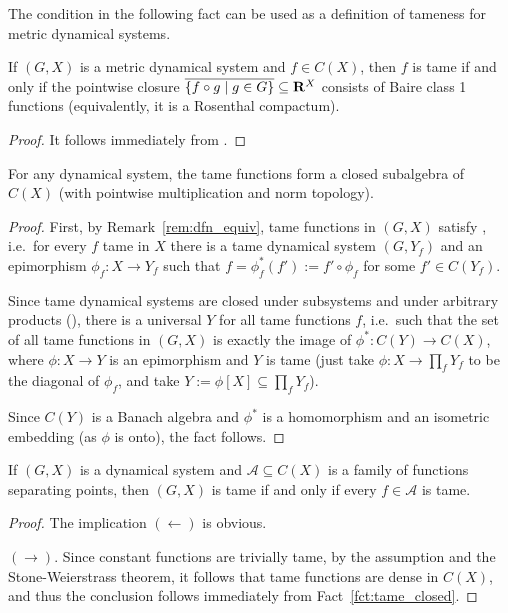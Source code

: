 	
	The condition in the following fact can be used as a definition of tameness for metric dynamical systems.
	\begin{fct}\label{fct: metric tameness}
		If $(G,X)$ is a metric dynamical system and $f\in C(X)$, then $f$ is tame if and only if the pointwise closure $\overline{\{f\circ g\mid g\in G \} }\subseteq {{\mathbf{R}}}^X$ consists of Baire class 1 functions (equivalently, it is a Rosenthal compactum).
	\end{fct}
	\begin{proof}
		It follows immediately from \cite[Fact 4.3 and Proposition 4.6]{GM12}.
	\end{proof}
	
	
	\begin{fct}
		\label{fct:tame_closed}
		For any dynamical system, the tame functions form a closed subalgebra of $C(X)$ (with pointwise multiplication and norm topology).
	\end{fct}
	\begin{proof}
		First, by Remark~\ref{rem:dfn_equiv}, tame functions in $(G,X)$ satisfy \cite[Definition 5.5]{GM12}, i.e.\ for every $f$ tame in $X$ there is a tame dynamical system $(G,Y_f)$ and an epimorphism $\phi_f\colon X\to Y_f$ such that $f=\phi_f^*(f'):=f'\circ \phi_f$ for some $f'\in C(Y_f)$.
		
		Since tame dynamical systems are closed under subsystems and under arbitrary products (\cite[Lemma 5.4]{GM12}), there is a universal $Y$ for all tame functions $f$, i.e.\ such that the set of all tame functions in $(G,X)$ is exactly the image of $\phi^*\colon C(Y)\to C(X)$, where $\phi\colon X\to Y$ is an epimorphism and $Y$ is tame (just take $\phi\colon X\to \prod_f Y_f$ to be the diagonal of $\phi_f$, and take $Y:=\phi[X] \subseteq \prod_f Y_f$).
		
		Since $C(Y)$ is a Banach algebra and $\phi^*$ is a homomorphism and an isometric embedding (as $\phi$ is onto), the fact follows.
	\end{proof}
	
	\begin{cor}
		\label{cor:tame_dense}
		If $(G,X)$ is a dynamical system and $\mathcal A\subseteq C(X)$ is a family of functions separating points, then $(G,X)$ is tame if and only if every $f\in \mathcal A$ is tame.
	\end{cor}
	\begin{proof}
		The implication $(\leftarrow)$ is obvious.
		
		$(\rightarrow)$.
		Since constant functions are trivially tame, by the assumption and the Stone-Weierstrass theorem, it follows that tame functions are dense in $C(X)$, and thus the conclusion follows immediately from Fact~\ref{fct:tame_closed}.
	\end{proof}
	
